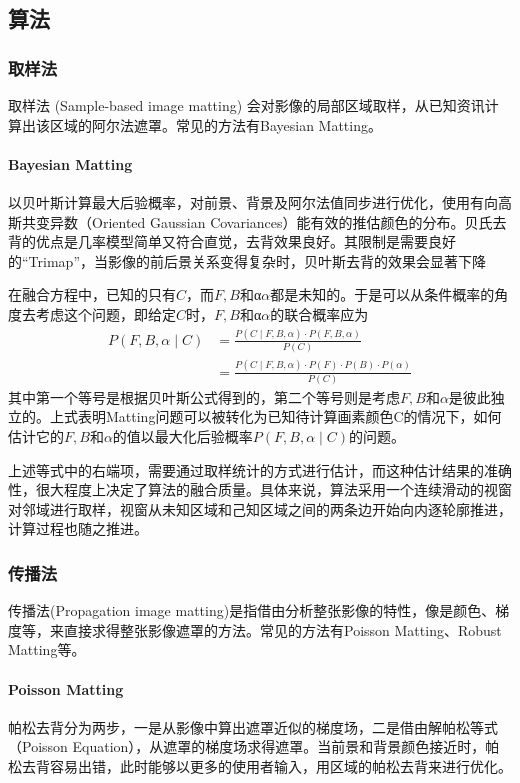 \documentclass[scheme=chinese,a4paper]{article}
\begin{document}
\subsection{算法}
\subsubsection{取样法}
取样法 (Sample-based image matting) 会对影像的局部区域取样，从已知资讯计算出该区域的阿尔法遮罩。常见的方法有Bayesian Matting。

\paragraph{Bayesian Matting}
以贝叶斯计算最大后验概率，对前景、背景及阿尔法值同步进行优化，使用有向高斯共变异数（Oriented Gaussian Covariances）能有效的推估颜色的分布。贝氏去背的优点是几率模型简单又符合直觉，去背效果良好。其限制是需要良好的“Trimap”，当影像的前后景关系变得复杂时，贝叶斯去背的效果会显著下降

在融合方程中，已知的只有$C$，而$F, B$和α$\alpha$都是未知的。于是可以从条件概率的角度去考虑这个问题，即给定$C$时，$F, B$和α$\alpha$的联合概率应为
\begin{align*}
  P(F,B,\alpha\mid C)
  &=\frac{P(C\mid F,B,\alpha)\cdot P(F,B,\alpha)}{P(C)}\\
  &=\frac{P(C\mid F,B,\alpha)\cdot P(F)\cdot P(B)\cdot P(\alpha)}{P(C)}
\end{align*}
其中第一个等号是根据贝叶斯公式得到的，第二个等号则是考虑$F, B$和$\alpha$是彼此独立的。上式表明Matting问题可以被转化为已知待计算画素颜色C的情况下，如何估计它的$F, B$和$\alpha$的值以最大化后验概率$P(F,B,\alpha\mid C)$的问题。

上述等式中的右端项，需要通过取样统计的方式进行估计，而这种估计结果的准确性，很大程度上决定了算法的融合质量。具体来说，算法采用一个连续滑动的视窗对邻域进行取样，视窗从未知区域和己知区域之间的两条边开始向内逐轮廓推进，计算过程也随之推进。
\subsubsection{传播法}
传播法(Propagation image matting)是指借由分析整张影像的特性，像是颜色、梯度等，来直接求得整张影像遮罩的方法。常见的方法有Poisson Matting、Robust Matting等。
\paragraph{Poisson Matting}
帕松去背分为两步，一是从影像中算出遮罩近似的梯度场，二是借由解帕松等式（Poisson Equation），从遮罩的梯度场求得遮罩。当前景和背景颜色接近时，帕松去背容易出错，此时能够以更多的使用者输入，用区域的帕松去背来进行优化。
\end{document}
